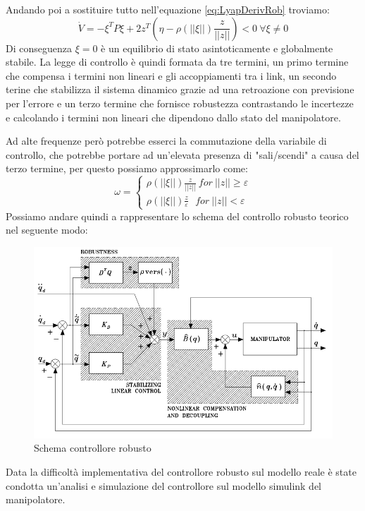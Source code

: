 Andando poi a sostituire tutto nell'equazione \ref{eq:LyapDerivRob} troviamo:
\begin{equation}
\dot{V} = -\xi^T P \xi + 2z^T(\eta-\rho(||\xi||) \frac{z}{||z||}) <0 \ \forall
\xi \neq 0
\end{equation}
Di conseguenza $\xi = 0$ è un equilibrio di stato asintoticamente e globalmente stabile. La legge di controllo è quindi formata da tre termini, un primo termine che compensa i termini non lineari e gli accoppiamenti tra i link, un secondo terine che stabilizza il sistema dinamico grazie ad una retroazione con previsione per l'errore e un terzo termine che fornisce robustezza contrastando le incertezze e calcolando i termini non lineari che dipendono dallo stato del manipolatore. 
\par Ad alte frequenze però potrebbe esserci la commutazione della variabile di controllo, che potrebbe portare ad un'elevata presenza di "sali/scendi" a causa del terzo termine, per questo possiamo approssimarlo come:
\begin{equation}
\omega = \begin{cases}
\rho(||\xi||) \frac{z}{||z||} \ for\ ||z||\ge \varepsilon \\
\rho(||\xi||) \frac{z}{\varepsilon} \ \ \ for \ ||z|| < \varepsilon
\end{cases}
\label{eq:epsilon}
\end{equation}
Possiamo andare quindi a rappresentare lo schema del controllo robusto teorico nel seguente modo:
\begin{figure}[ht]
	\begin{center}
		\includegraphics[scale=0.8]{Immagini/Controllori/RobustTeoria}
		\caption{Schema controllore robusto}
		\label{fig:RobustSchema}
	\end{center}
\end{figure}
Data la difficoltà implementativa del controllore robusto sul modello reale è state condotta un'analisi e simulazione del controllore sul modello simulink del manipolatore.

